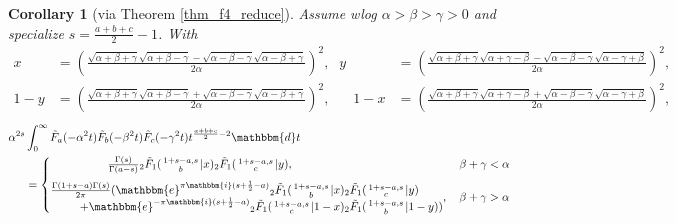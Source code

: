 \documentclass[12pt]{article}
\newcommand{\ee}[0] {\mathbbm{e}}
\newcommand{\ii}[0] {\mathbbm{i}}
\newcommand{\dd}[0] {\mathbbm{d}}
\numberwithin{equation}{section}
\newtheorem{corollary}[theorem]{Corollary}
\newcommand{\Head}[3] {{}_{#1}{#2}_{#3}}
\newcommand{\ArgS}[3] {( \begin{smallmatrix} #1 \\ #2 \end{smallmatrix} | {#3})}
\newcommand{\HypJreg}[2] {{\tilde{F}}_{#1}(#2)}
\begin{document}
\begin{corollary}[via Theorem \ref{thm_f4_reduce}]
Assume wlog $\alpha > \beta > \gamma > 0$ and specialize $s=\frac{a+b+c}{2}-1$. With
\begin{equation*}
\begin{alignedat}{7}
x &= (\tfrac{\sqrt{\alpha +\beta +\gamma }\sqrt{\alpha +\beta -\gamma }-\sqrt{\alpha -\beta -\gamma } \sqrt{\alpha
   -\beta +\gamma }}{2 \alpha })^2\text{,}& y &= (\tfrac{\sqrt{\alpha +\beta +\gamma }\sqrt{\alpha +\gamma-\beta }-\sqrt{\alpha -\beta -\gamma } \sqrt{\alpha-\gamma +\beta }}{2 \alpha })^2\text{,}\\
1-y &= (\tfrac{\sqrt{\alpha +\beta +\gamma }\sqrt{\alpha +\beta -\gamma }+\sqrt{\alpha -\beta -\gamma } \sqrt{\alpha
   -\beta +\gamma }}{2 \alpha })^2\text{,}& \quad 1-x &= (\tfrac{\sqrt{\alpha +\beta +\gamma }\sqrt{\alpha +\gamma-\beta }+\sqrt{\alpha -\beta -\gamma } \sqrt{\alpha-\gamma +\beta }}{2 \alpha })^2\text{,}
\end{alignedat}
\end{equation*}
\begin{align*}
\alpha^{2s} &\int_{0}^{\infty} \HypJreg{a}{-\alpha^2 t} \HypJreg{b}{-\beta^2 t} \HypJreg{c}{-\gamma^2 t} t^{\frac{a+b+c}{2}-2} \dd t\\
&= \begin{cases}
\quad \quad \quad \quad \quad \tfrac{\Gamma(s)}{\Gamma(a-s)}  \Head{2}{{\tilde{F}}}{1} \ArgS{1+s-a,s}{b}{x} \Head{2}{{\tilde{F}}}{1} \ArgS{1+s-a,s}{c}{y}\text{,} \, &\beta + \gamma < \alpha\\
\vspace{-8pt}\\
\begin{aligned}
\tfrac{\Gamma(1+s-a)\Gamma(s)}{2\pi} (\ee^{\pi \ii (s+\frac12-a)} \Head2{\tilde{F}}1 \ArgS{1+s-a,s}{b}{x} & \Head{2}{{\tilde{F}}}{1} \ArgS{1+s-a,s}{c}{y}\\
\quad + \ee^{-\pi \ii (s+\frac12-a)} \Head2{\tilde{F}}1 \ArgS{1+s-a,s}{c}{1-x} & \Head2{\tilde{F}}1 \ArgS{1+s-a,s}{b}{1-y})
\end{aligned}
\text{,} \, &\beta + \gamma > \alpha\\
\end{cases}
\end{align*}
\end{corollary}
\end{document}
